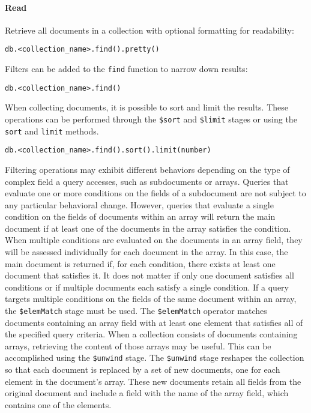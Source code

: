 \paragraph*{Read}
Retrieve all documents in a collection with optional formatting for readability:
\begin{lstlisting}[style=MongoDB]
db.<collection_name>.find().pretty()
\end{lstlisting}
Filters can be added to the \texttt{find} function to narrow down results:
\begin{lstlisting}[style=MongoDB] 
db.<collection_name>.find() 
\end{lstlisting}
When collecting documents, it is possible to sort and limit the results. 
These operations can be performed through the \texttt{\$sort} and \texttt{\$limit} stages or using the \texttt{sort} and \texttt{limit} methods.
\begin{lstlisting}[style=MongoDB] 
db.<collection_name>.find().sort().limit(number)
\end{lstlisting}
Filtering operations may exhibit different behaviors depending on the type of complex field a query accesses, such as subdocuments or arrays. 
Queries that evaluate one or more conditions on the fields of a subdocument are not subject to any particular behavioral change. 
However, queries that evaluate a single condition on the fields of documents within an array will return the main document if at least one of the documents in the array satisfies the condition. 
When multiple conditions are evaluated on the documents in an array field, they will be assessed individually for each document in the array. 
In this case, the main document is returned if, for each condition, there exists at least one document that satisfies it. 
It does not matter if only one document satisfies all conditions or if multiple documents each satisfy a single condition.
If a query targets multiple conditions on the fields of the same document within an array, the \texttt{\$elemMatch} stage must be used. 
The \texttt{\$elemMatch} operator matches documents containing an array field with at least one element that satisfies all of the specified query criteria.
When a collection consists of documents containing arrays, retrieving the content of those arrays may be useful. This can be accomplished using the \texttt{\$unwind} stage. 
The \texttt{\$unwind} stage reshapes the collection so that each document is replaced by a set of new documents, one for each element in the document's array.
These new documents retain all fields from the original document and include a field with the name of the array field, which contains one of the elements.

